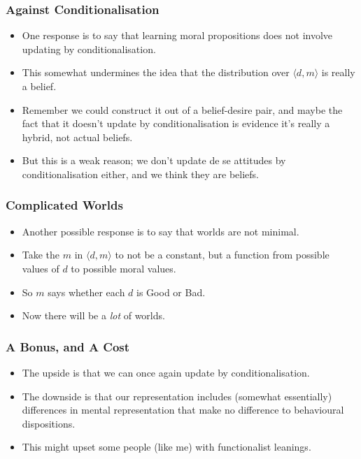 \begin{frame}[fragile]
\frametitle{Against Conditionalisation}
\label{againstconditionalisation}

\begin{itemize}
\item{} One response is to say that learning moral propositions does not involve updating by conditionalisation.

\item{} This somewhat undermines the idea that the distribution over $\langle d, m \rangle$ is really a belief.

\item{} Remember we could construct it out of a belief-desire pair, and maybe the fact that it doesn't update by conditionalisation is evidence it's really a hybrid, not actual beliefs.

\item{} But this is a weak reason; we don't update de se attitudes by conditionalisation either, and we think they are beliefs.

\end{itemize}

\end{frame}

\begin{frame}[fragile]
\frametitle{Complicated Worlds}
\label{complicatedworlds}

\begin{itemize}
\item{} Another possible response is to say that worlds are not minimal.

\item{} Take the $m$ in $\langle d, m\rangle$ to not be a constant, but a function from possible values of $d$ to possible moral values.

\item{} So $m$ says whether each $d$ is Good or Bad.

\item{} Now there will be a \emph{lot} of worlds.

\end{itemize}

\end{frame}

\begin{frame}[fragile]
\frametitle{A Bonus, and A Cost}
\label{abonusandacost}

\begin{itemize}
\item{} The upside is that we can once again update by conditionalisation.

\item{} The downside is that our representation includes (somewhat essentially) differences in mental representation that make no difference to behavioural dispositions.

\item{} This might upset some people (like me) with functionalist leanings.

\end{itemize}

\end{frame}

